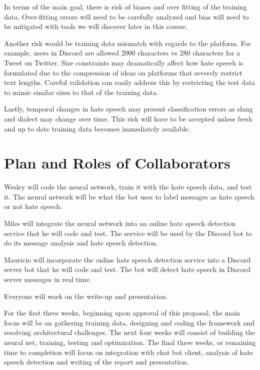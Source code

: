 \documentclass[conference]{sig-alternate-05-2015}
\begin{document}
In terms of the main goal, there is risk of biases and over fitting of the training data.  Over-fitting errors will need to be carefully analyzed and bias will need to be mitigated with tools we will discover later in this course.

Another risk would be training data mismatch with regards to the platform.  For example, users in Discord are allowed 2000 characters vs 280 characters for a Tweet on Twitter.  Size constraints may dramatically affect how hate speech is formulated due to the compression of ideas on platforms that severely restrict text lengths.  Careful validation can easily address this by restricting the test data to mimic similar sizes to that of the training data.

Lastly, temporal changes in hate speech may present classification errors as slang and dialect may change over time.  This risk will have to be accepted unless fresh and up to date training data becomes immediately available.

\section{Plan and Roles of Collaborators}

Wesley will code the neural network, train it with the hate speech data, and test it. The neural network will be what the bot uses to label messages as hate speech or not hate speech.

Miles will integrate the neural network into an online hate speech detection service that he will code and test. The service will be used by the Discord bot to do its message analysis and hate speech detection. 

Mauricio will incorporate the online hate speech detection service into a Discord server bot that he will code and test. The bot will detect hate speech in Discord server messages in real time.

Everyone will work on the write-up and presentation.

For the first three weeks, beginning upon approval of this proposal, the main focus will be on gathering training data, designing and coding the framework and resolving architectural challenges.  The next four weeks will consist of building the neural net, training, testing and optimization.  The final three weeks, or remaining time to completion will focus on integration with chat bot client, analysis of hate speech detection and writing of the report and presentation.
\end{document}
